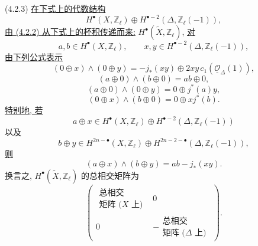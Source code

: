\smallskip
\noindent
\textup{(4.2.3)} \underline{在下式上的代数结构}
\[
H^\bullet(X,\mathbb Z_\ell)\oplus
H^{\bullet-2}(\Delta,\mathbb Z_\ell(-1)),
\]
\underline{由 (4.2.2) 从下式上的杯积传递而来:}
$H^\bullet(\widetilde X,\mathbb Z_\ell)$,
\underline{对}
\[
a,b\in H^\bullet(X,\mathbb Z_\ell),
\qquad
x,y\in H^{\bullet-2}(\Delta,\mathbb Z_\ell(-1)),
\]
\underline{由下列公式表示}
\begin{equation}\tag{4.2.3.1}
(0\oplus x)\wedge(0\oplus y)
=-j_*(xy)\oplus2xy\,c_1(\underline{\mathcal O}_\Delta(1)),
\end{equation}
\begin{equation}\tag{4.2.3.2}
(a\oplus0)\wedge(b\oplus0)=ab\oplus0,
\end{equation}
\begin{equation}\tag{4.2.3.3}
(a\oplus0)\wedge(0\oplus y)=0\oplus j^*(a)y,
\end{equation}
\begin{equation}\tag{4.2.3.4}
(0\oplus x)\wedge(b\oplus0)=0\oplus xj^*(b).
\end{equation}
\underline{特别地, 若}
\[
a\oplus x\in H^\bullet(X,\mathbb Z_\ell)
  \oplus H^{\bullet-2}(\Delta,\mathbb Z_\ell(-1))
\]
以及
\[
b\oplus y\in H^{2n-\bullet}(X,\mathbb Z_\ell)
  \oplus H^{2n-2-\bullet}(\Delta,\mathbb Z_\ell(-1)),
\]
\underline{则}
\begin{equation}\tag{4.2.3.5}
(a\oplus x)\wedge(b\oplus y)=ab-j_*(xy).
\end{equation}
换言之, $H^\bullet(\widetilde X,\mathbb Z_\ell)$ 的总相交矩阵为
\[
\left(
\begin{array}{c|c}
\begin{array}{c}
\text{总相交}\\[-1pt]
\text{矩阵 ($X$ 上)}
\end{array} & 0\\ \hline
0 &
-\begin{array}{c}
\text{总相交}\\[-1pt]
\text{矩阵 ($\Delta$ 上)}
\end{array}
\end{array}
\right).
\]

